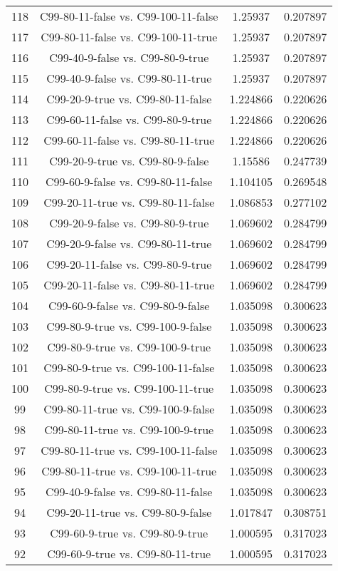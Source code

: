 \documentclass[a4paper,10pt]{article}
\begin{document}
\begin{landscape}
\begin{table}[!htp]
\begin{tabular}{cccc}
118&C99-80-11-false vs. C99-100-11-false&1.25937&0.207897\\
117&C99-80-11-false vs. C99-100-11-true&1.25937&0.207897\\
116&C99-40-9-false vs. C99-80-9-true&1.25937&0.207897\\
115&C99-40-9-false vs. C99-80-11-true&1.25937&0.207897\\
114&C99-20-9-true vs. C99-80-11-false&1.224866&0.220626\\
113&C99-60-11-false vs. C99-80-9-true&1.224866&0.220626\\
112&C99-60-11-false vs. C99-80-11-true&1.224866&0.220626\\
111&C99-20-9-true vs. C99-80-9-false&1.15586&0.247739\\
110&C99-60-9-false vs. C99-80-11-false&1.104105&0.269548\\
109&C99-20-11-true vs. C99-80-11-false&1.086853&0.277102\\
108&C99-20-9-false vs. C99-80-9-true&1.069602&0.284799\\
107&C99-20-9-false vs. C99-80-11-true&1.069602&0.284799\\
106&C99-20-11-false vs. C99-80-9-true&1.069602&0.284799\\
105&C99-20-11-false vs. C99-80-11-true&1.069602&0.284799\\
104&C99-60-9-false vs. C99-80-9-false&1.035098&0.300623\\
103&C99-80-9-true vs. C99-100-9-false&1.035098&0.300623\\
102&C99-80-9-true vs. C99-100-9-true&1.035098&0.300623\\
101&C99-80-9-true vs. C99-100-11-false&1.035098&0.300623\\
100&C99-80-9-true vs. C99-100-11-true&1.035098&0.300623\\
99&C99-80-11-true vs. C99-100-9-false&1.035098&0.300623\\
98&C99-80-11-true vs. C99-100-9-true&1.035098&0.300623\\
97&C99-80-11-true vs. C99-100-11-false&1.035098&0.300623\\
96&C99-80-11-true vs. C99-100-11-true&1.035098&0.300623\\
95&C99-40-9-false vs. C99-80-11-false&1.035098&0.300623\\
94&C99-20-11-true vs. C99-80-9-false&1.017847&0.308751\\
93&C99-60-9-true vs. C99-80-9-true&1.000595&0.317023\\
92&C99-60-9-true vs. C99-80-11-true&1.000595&0.317023\\

\end{tabular}
\end{table}
\end{landscape}
\end{document}
